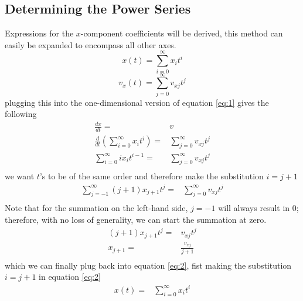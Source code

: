 \documentclass[9pt]{article}
\begin{document}
\begin{multicols}{2}
\subsection{Determining the Power Series}
Expressions for the $x$-component coefficients will be derived, this method can easily be expanded to encompass all other axes. 
    \begin{equation}\label{eq:2}    
        x(t)=\sum_{i=0}^\infty x_it^i 
    \end{equation}
    \begin{equation}\label{eq:3}  
        v_x(t)=\sum_{j=0}^\infty v_{xj}t^j    
    \end{equation}
plugging this into the one-dimensional version of equation \ref{eq:1} gives the following
    \begin{equation}
        \begin{split}
            \frac{dx}{dt}=&v\\
            \frac{d}{dt}\left(\sum_{i=0}^\infty x_it^i\right)=& \sum_{j=0}^\infty v_{xj}t^j\\ 
            \sum_{i=0}^\infty ix_it^{i-1}=&\sum_{j=0}^\infty v_{xj}t^j\\ 
        \end{split}
    \end{equation}
we want $t$'s to be of the same order and therefore make the substitution $i=j+1$    
    \begin{equation}
        \begin{split}
            \sum_{j=-1}^\infty (j+1)x_{j+1}t^{j}=&\sum_{j=0}^\infty v_{xj}t^j\\ 
        \end{split}
    \end{equation}
Note that for the summation on the left-hand side, $j=-1$ will always result in 0; therefore, with no loss of generality, we can start the summation at zero.
    \begin{equation}
        \begin{split}
           (j+1)x_{j+1}t^{j}=&v_{xj}t^j\\  
        x_{j+1}=&\frac{v_{xj}}{j+1}\\
        \end{split}
    \end{equation}
which we can finally plug back into equation \ref{eq:2}, fist making the substitution $i=j+1$ in equation \ref{eq:2} 
    \begin{equation}
        \begin{split}
            x(t)=&\sum_{i=0}^\infty x_it^i\\

\end{split}
\end{equation}
\end{multicols}
\end{document}
